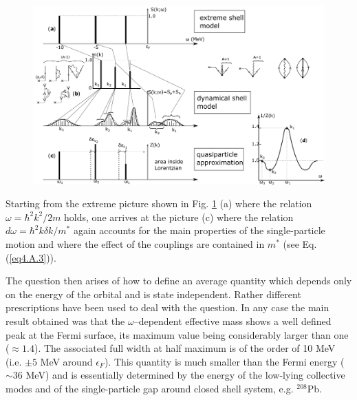         \begin{figure}
        \centerline{\includegraphics*[width=22cm,angle=90]{C6/figs_C6/fig4I1.pdf}}
        	\caption{}\label{fig8.F.1}
        \end{figure}


Starting from the extreme picture shown in Fig. \ref{fig8.F.1} (a) where the relation $\omega=\hbar^2k^2/2m$ holds, one arrives at the picture (c) where the relation $d\omega=\hbar^2k\delta k/m^*$ again accounts for the main properties of the single-particle motion and where the effect of the couplings are contained in $m^*$ (see Eq. (\ref{eq4.A.3})).

The question then arises of how to define an average quantity which depends only on the energy of the orbital and is state independent. Rather different prescriptions have been used to deal with the question. In any case the main result obtained was that the $\omega$--dependent effective mass shows a well defined peak at the Fermi surface, its maximum value being considerably larger than one ($\approx 1.4$). The associated full width at half maximum is of the order of 10 MeV (i.e. $\pm 5$ MeV around $\epsilon_F$). This quantity is much smaller than the Fermi energy ($\sim 36$ MeV) and is essentially determined by the energy of the low-lying collective modes and of the single-particle gap around closed shell system, e.g. $^{208}$Pb.

